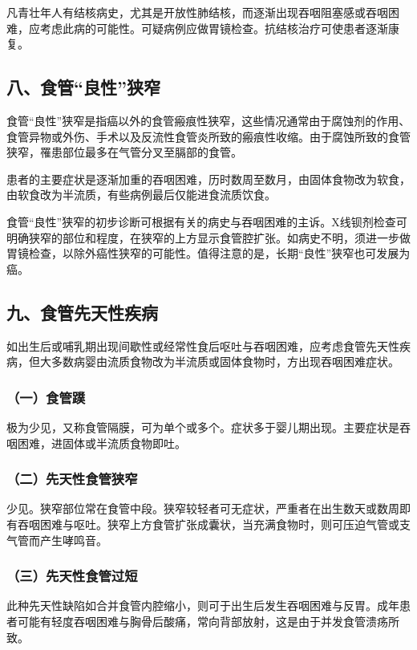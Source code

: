 凡青壮年人有结核病史，尤其是开放性肺结核，而逐渐出现吞咽阻塞感或吞咽困难，应考虑此病的可能性。可疑病例应做胃镜检查。抗结核治疗可使患者逐渐康复。

\subsection{八、食管“良性”狭窄}

食管“良性”狭窄是指癌以外的食管瘢痕性狭窄，这些情况通常由于腐蚀剂的作用、食管异物或外伤、手术以及反流性食管炎所致的瘢痕性收缩。由于腐蚀所致的食管狭窄，罹患部位最多在气管分叉至膈部的食管。

患者的主要症状是逐渐加重的吞咽困难，历时数周至数月，由固体食物改为软食，由软食改为半流质，有些病例最后仅能进食流质饮食。

食管“良性”狭窄的初步诊断可根据有关的病史与吞咽困难的主诉。X线钡剂检查可明确狭窄的部位和程度，在狭窄的上方显示食管腔扩张。如病史不明，须进一步做胃镜检查，以除外癌性狭窄的可能性。值得注意的是，长期“良性”狭窄也可发展为癌。

\subsection{九、食管先天性疾病}

如出生后或哺乳期出现间歇性或经常性食后呕吐与吞咽困难，应考虑食管先天性疾病，但大多数病婴由流质食物改为半流质或固体食物时，方出现吞咽困难症状。

\subsubsection{（一）食管蹼}

极为少见，又称食管隔膜，可为单个或多个。症状多于婴儿期出现。主要症状是吞咽困难，进固体或半流质食物即吐。

\subsubsection{（二）先天性食管狭窄}

少见。狭窄部位常在食管中段。狭窄较轻者可无症状，严重者在出生数天或数周即有吞咽困难与呕吐。狭窄上方食管扩张成囊状，当充满食物时，则可压迫气管或支气管而产生哮鸣音。

\subsubsection{（三）先天性食管过短}

此种先天性缺陷如合并食管内腔缩小，则可于出生后发生吞咽困难与反胃。成年患者可能有轻度吞咽困难与胸骨后酸痛，常向背部放射，这是由于并发食管溃疡所致。

